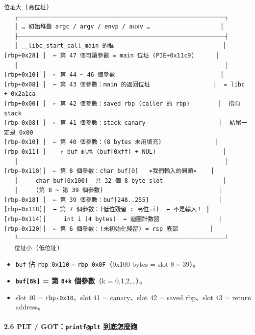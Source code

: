 \documentclass[10pt,a4paper]{article}
\providecommand{\tightlist}{%
  \setlength{\itemsep}{0pt}\setlength{\parskip}{0pt}}
\begin{document}
\begin{Verbatim}[breaklines=true,breakanywhere=true,breakautoindent=false,fontsize=\fontsize{7.0}{9.5}\selectfont]
   位址大 (高位址)
   ┌───────────────────────────────────────────────────────────┐
   │ … 初始堆疊 argc / argv / envp / auxv …                    │
   ├───────────────────────────────────────────────────────────┤
   │ __libc_start_call_main 的框                               │
[rbp+0x28] │  ← 第 47 個可讀參數 = main 位址 (PIE+0x11c9)      │
   │                                                           │
[rbp+0x10] │  ← 第 44 ~ 46 個參數                              │
[rbp+0x08] │  ← 第 43 個參數：main 的返回位址                  │  = libc + 0x2a1ca
[rbp+0x00] │  ← 第 42 個參數：saved rbp (caller 的 rbp)        │  指向 stack
[rbp-0x08] │  ← 第 41 個參數：stack canary                     │  結尾一定是 0x00
[rbp-0x10] │  ← 第 40 個參數：(8 bytes 未用填充)               │
[rbp-0x11] │    ↑ buf 結尾 (buf[0xff] + NUL)                   │
   │                                                           │
[rbp-0x110]│  ← 第 8 個參數：char buf[0]   ✶我們輸入的開頭✶    │
   │     char buf[0x100]  共 32 個 8-byte slot                 │
   │     (第 8 ~ 第 39 個參數)                                 │
[rbp-0x18] │  ← 第 39 個參數：buf[248..255]                    │
[rbp-0x118]│  ← 第 7 個參數：(低位殘留 : 高位=i)  ← 不是輸入！ │
[rbp-0x114]│     int i (4 bytes)  ← 迴圈計數器                 │
[rbp-0x120]│  ← 第 6 個參數：(未初始化殘留) = rsp 底部         │
   └───────────────────────────────────────────────────────────┘
   位址小 (低位址)
\end{Verbatim}

\begin{itemize}
\tightlist
\item
  \texttt{buf} 佔 \texttt{rbp-\allowbreak{}0x110} \textasciitilde{}
  \texttt{rbp-\allowbreak{}0x0F}（0x100 bytes = slot 8 \textasciitilde{} 39）。
\item
  \textbf{\texttt{buf{[}8k{]}} = 第 \texttt{8+k} 個參數}（k =
  0,1,2,\ldots）。
\item
  slot 40 = \texttt{rbp-\allowbreak{}0x10}、slot 41 = canary、slot 42 = saved
  rbp、slot 43 = return address。
\end{itemize}

\paragraph{\texorpdfstring{2.6 PLT / GOT：\texttt{printf@plt}
到底怎麼跑}{2.6 PLT / GOT：printf@plt 到底怎麼跑}}\label{plt-gotprintfplt-ux5230ux5e95ux600eux9ebcux8dd1}
\end{document}

